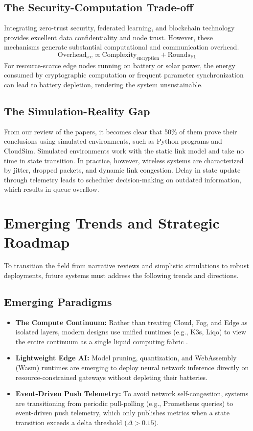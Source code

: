 \documentclass[conference]{IEEEtran}
\begin{document}
\subsection{The Security-Computation Trade-off}
Integrating zero-trust security, federated learning, and blockchain technology \cite{b8,b30} provides excellent data confidentiality and node trust. However, these mechanisms generate substantial computational and communication overhead. 
$$\text{Overhead}_{\text{sec}} \propto \text{Complexity}_{\text{encryption}} + \text{Rounds}_{\text{FL}}$$
For resource-scarce edge nodes running on battery or solar power, the energy consumed by cryptographic computation or frequent parameter synchronization can lead to battery depletion, rendering the system unsustainable.

\subsection{The Simulation-Reality Gap}
From our review of the papers, it becomes clear that 50\% of them prove their conclusions using simulated environments, such as Python programs and CloudSim. Simulated environments work with the static link model and take no time in state transition. In practice, however, wireless systems are characterized by jitter, dropped packets, and dynamic link congestion. Delay in state update through telemetry leads to scheduler decision-making on outdated information, which results in queue overflow.


\section{Emerging Trends and Strategic Roadmap}
\label{sec:trends}

To transition the field from narrative reviews and simplistic simulations to robust deployments, future systems must address the following trends and directions.

\subsection{Emerging Paradigms}
\begin{itemize}
    \item \textbf{The Compute Continuum:} Rather than treating Cloud, Fog, and Edge as isolated layers, modern designs use unified runtimes (e.g., K3s, Liqo) to view the entire continuum as a single liquid computing fabric \cite{b26}.
    \item \textbf{Lightweight Edge AI:} Model pruning, quantization, and WebAssembly (Wasm) runtimes are emerging to deploy neural network inference directly on resource-constrained gateways without depleting their batteries.
    \item \textbf{Event-Driven Push Telemetry:} To avoid network self-congestion, systems are transitioning from periodic pull-polling (e.g., Prometheus queries) to event-driven push telemetry, which only publishes metrics when a state transition exceeds a delta threshold ($\Delta > 0.15$).
\end{itemize}
\end{document}
